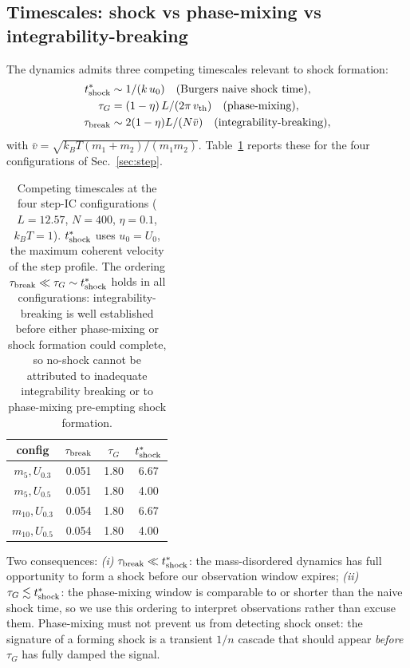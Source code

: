 \documentclass[aps,pre,twocolumn,superscriptaddress,longbibliography,floatfix]{revtex4-2}
\begin{document}
\subsection{Timescales: shock vs phase-mixing vs
integrability-breaking}\label{sec:timescales}

The dynamics admits three competing timescales relevant to shock
formation:
\begin{align}
t^*_{\rm shock}    &\sim 1/(k\,u_0)
                     \quad\text{(Burgers naive shock time)},
\label{eq:tshock}\\
\tau_G &= (1-\eta)\,L/(2\pi\,v_{\rm th})
         \quad\text{(phase-mixing)},
\label{eq:tauG}\\
\tau_{\rm break} &\sim 2(1-\eta)L/(N\bar v)
         \quad\text{(integrability-breaking)},
\label{eq:taubr}
\end{align}
with $\bar v=\sqrt{k_B T(m_1+m_2)/(m_1 m_2)}$.
Table~\ref{tab:timescales} reports these for the four
configurations of Sec.~\ref{sec:step}.

\begin{table}[t]
\centering
\caption{Competing timescales at the four step-IC
configurations ($L=12.57$, $N=400$, $\eta=0.1$, $k_B T=1$).
$t^*_{\rm shock}$ uses $u_0=U_0$, the maximum coherent velocity
of the step profile. The ordering
$\tau_{\rm break}\ll \tau_G\sim t^*_{\rm shock}$ holds in all
configurations: integrability-breaking is well established
before either phase-mixing or shock formation could complete,
so no-shock cannot be attributed to inadequate integrability
breaking or to phase-mixing pre-empting shock formation.}
\label{tab:timescales}
\begin{tabular}{cccc}
\hline\hline
config & $\tau_{\rm break}$ & $\tau_G$ & $t^*_{\rm shock}$\\
\hline
$m_5, U_{0.3}$   & 0.051 & 1.80 & 6.67 \\
$m_5, U_{0.5}$   & 0.051 & 1.80 & 4.00 \\
$m_{10},U_{0.3}$ & 0.054 & 1.80 & 6.67 \\
$m_{10},U_{0.5}$ & 0.054 & 1.80 & 4.00 \\
\hline\hline
\end{tabular}
\end{table}

Two consequences:
\emph{(i)} $\tau_{\rm break}\ll t^*_{\rm shock}$: the
mass-disordered dynamics has full opportunity to form a
shock before our observation window expires;
\emph{(ii)} $\tau_G\lesssim t^*_{\rm shock}$: the
phase-mixing window is comparable to or shorter than the
naive shock time, so we use this ordering to interpret
observations rather than excuse them. Phase-mixing must not
prevent us from detecting shock onset: the signature of a
forming shock is a transient $1/n$ cascade that should appear
\emph{before} $\tau_G$ has fully damped the signal.
\end{document}
